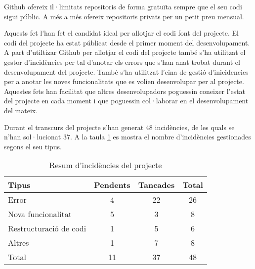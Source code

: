 Github ofereix il·limitats repositoris de forma gratuïta sempre que el seu codi sigui públic. A més a més ofereix repositoris privats per un petit preu mensual. 

Aquests fet l'han fet el candidat ideal per allotjar el codi font del projecte. El codi del projecte ha estat públicat desde el primer moment del desenvolupament. A part d'utiltizar Github per allotjar el codi del projecte també s'ha utilitzat el gestor d'incidències per tal d'anotar els errors que s'han anat trobat durant el desenvolupament del projecte. També s'ha utilitzat l'eina de gestió d'inicidencies per a anotar les noves funcionalitats que es volien desenvolupar per al projecte. Aquestes fets han facilitat que altres desenvolupadors poguessin coneixer l'estat del projecte en cada moment i que poguessin col·laborar en el desenvolupament del mateix. 

Durant el transcurs del projecte s'han generat 48 incidències, de les quals se n'han sol·lucionat 37. A la taula \ref{t:resum-incidencies} es mostra el nombre d'incidències gestionades segons el seu tipus.

\begin{table}[htbp]\begin{center}\begin{tabular}{|l|c|c|c|}
\hline
\textbf{Tipus} & \textbf{Pendents} & \textbf{Tancades} & \textbf{Total} \\ \hline
Error & 4 & 22 & 26 \\ \hline
Nova  funcionalitat & 5 & 3 & 8 \\ \hline
Restructuració de codi & 1 & 5 & 6 \\ \hline
Altres & 1 & 7 & 8 \\ \hline
Total & 11 & 37 & 48 \\ \hline
\end{tabular}\end{center}
\caption{Resum d'incidències del projecte}\label{t:resum-incidencies}
\end{table} 

